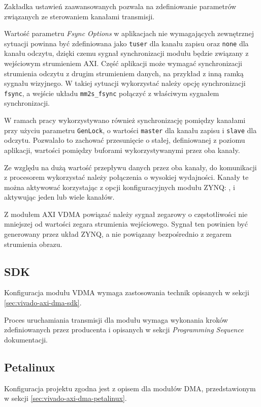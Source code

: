 Zakładka ustawień zaawansowanych pozwala na zdefiniowanie parametrów związanych ze sterowaniem kanałami transmisji.

Wartość parametru \textit{Fsync Options} w aplikacjach nie wymagających zewnętrznej sytuacji powinna być zdefiniowana jako \texttt{tuser} dla kanału zapisu oraz \texttt{none} dla kanału odczytu, dzięki czemu sygnał synchronizacji modułu będzie związany z wejściowym strumieniem AXI. Część aplikacji może wymagać synchronizacji strumienia odczytu z drugim strumieniem danych, na przykład z inną ramką sygnału wizyjnego. W takiej sytuacji wykorzystać należy opcję synchronizacji \texttt{fsync}, a wejście układu \texttt{mm2s\_fsync} połączyć z właściwym sygnałem synchronizacji.

W ramach pracy wykorzystywano również synchronizację pomiędzy kanałami przy użyciu parametru \texttt{GenLock}, o wartości \texttt{master} dla kanału zapisu i \texttt{slave} dla odczytu. Pozwalało to zachować przesunięcie o stałej, definiowanej z poziomu aplikacji, wartości pomiędzy buforami wykorzystywanymi przez oba kanały.

Ze względu na dużą wartość przepływu danych przez oba kanały, do komunikacji z procesorem wykorzystać należy połączenia o wysokiej wydajności. Kanały te można aktywować korzystając z opcji konfiguracyjnych modułu ZYNQ: , i aktywując jeden lub wiele kanałów.

Z modułem AXI VDMA powiązać należy sygnał zegarowy o częstotliwości nie mniejszej od wartości zegara strumienia wejściowego. Sygnał ten powinien być generowany przez układ ZYNQ, a nie powiązany bezpośrednio z zegarem strumienia obrazu.

\subsection{SDK}
Konfiguracja modułu VDMA wymaga zastosowania technik opisanych w sekcji \ref{sec:vivado-axi-dma-sdk}.

Proces uruchamiania transmisji dla modułu wymaga wykonania kroków zdefiniowanych przez producenta i opisanych w sekcji \textit{Programming Sequence} dokumentacji. \cite{axi-vdma-guide}
\subsection{Petalinux}
Konfiguracja projektu zgodna jest z opisem dla modułów DMA, przedstawionym w sekcji \ref{sec:vivado-axi-dma-petalinux}.

